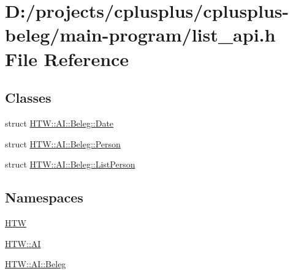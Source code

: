 \hypertarget{main-program_2list__api_8h}{\section{D\-:/projects/cplusplus/cplusplus-\/beleg/main-\/program/list\-\_\-api.h File Reference}
\label{main-program_2list__api_8h}
}
\subsection*{Classes}
\begin{DoxyCompactItemize}
\item 
struct \hyperlink{struct_h_t_w_1_1_a_i_1_1_beleg_1_1_date}{H\-T\-W\-::\-A\-I\-::\-Beleg\-::\-Date}
\item 
struct \hyperlink{struct_h_t_w_1_1_a_i_1_1_beleg_1_1_person}{H\-T\-W\-::\-A\-I\-::\-Beleg\-::\-Person}
\item 
struct \hyperlink{struct_h_t_w_1_1_a_i_1_1_beleg_1_1_list_person}{H\-T\-W\-::\-A\-I\-::\-Beleg\-::\-List\-Person}
\end{DoxyCompactItemize}
\subsection*{Namespaces}
\begin{DoxyCompactItemize}
\item 
\hyperlink{namespace_h_t_w}{H\-T\-W}
\item 
\hyperlink{namespace_h_t_w_1_1_a_i}{H\-T\-W\-::\-A\-I}
\item 
\hyperlink{namespace_h_t_w_1_1_a_i_1_1_beleg}{H\-T\-W\-::\-A\-I\-::\-Beleg}
\end{DoxyCompactItemize}
